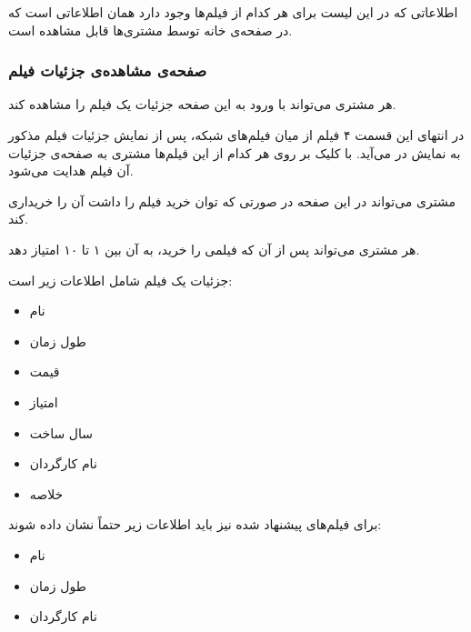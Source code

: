 \documentclass{utap}
\begin{document}
        اطلاعاتی که در این لیست برای هر کدام از فیلم‌ها وجود دارد همان اطلاعاتی‌ است که در صفحه‌ی خانه توسط مشتری‌ها قابل مشاهده است.

    
        \subsubsection{صفحه‌ی مشاهده‌ی جزئیات فیلم }
        
        هر مشتری می‌تواند با ورود به این صفحه جزئیات یک فیلم را مشاهده کند. 
        
        در  انتهای این قسمت ۴ فیلم از میان فیلم‌های شبکه، پس از نمایش جزئیات فیلم مذکور به نمایش در می‌آید. 
    با کلیک بر روی هر کدام از این فیلم‌ها مشتری به صفحه‌ی جزئیات آن فیلم هدایت می‌شود. 
        
        مشتری می‌تواند در این صفحه در صورتی که توان خرید فیلم را داشت آن‌ را خریداری کند. 
        
        هر مشتری می‌تواند پس از آن‌ که فیلمی را خرید، به آن بین ۱ تا ۱۰ امتیاز دهد. 
        
        جزئیات یک فیلم شامل اطلاعات زیر است: 
        
        \begin{multicols}{3}
        \begin{itemize}
            \item نام 
            \item طول زمان  
            \item قیمت 
            \item امتیاز 
            \item سال ساخت
            \item نام کارگردان
            \item خلاصه‌
        \end{itemize}
        \end{multicols}
    
        
        برای فیلم‌های پیشنهاد شده نیز باید اطلاعات زیر حتماً نشان داده شوند:
        
        \begin{multicols}{3}
            \begin{itemize}
                \item نام
                \item طول زمان
                \item نام کارگردان
            \end{itemize}
        \end{multicols}
    
\end{document}
